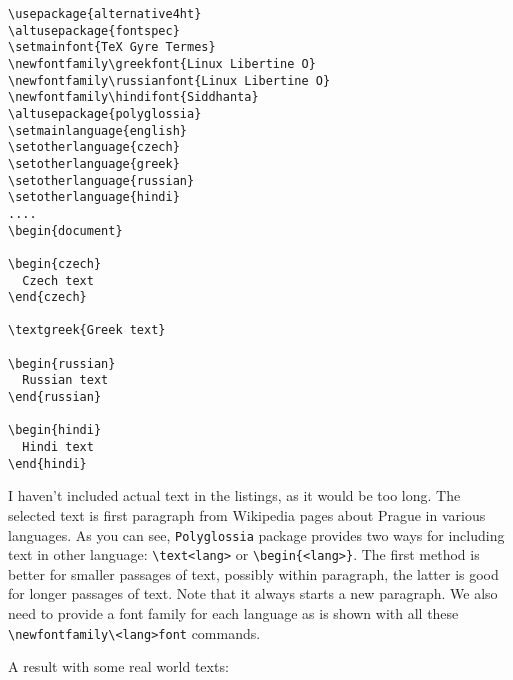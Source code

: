 \documentclass{article}
\begin{document}
\begin{verbatim}
\usepackage{alternative4ht}
\altusepackage{fontspec}
\setmainfont{TeX Gyre Termes}
\newfontfamily\greekfont{Linux Libertine O}
\newfontfamily\russianfont{Linux Libertine O}
\newfontfamily\hindifont{Siddhanta}
\altusepackage{polyglossia}
\setmainlanguage{english}
\setotherlanguage{czech}
\setotherlanguage{greek}
\setotherlanguage{russian}
\setotherlanguage{hindi}
....
\begin{document}

\begin{czech}
  Czech text
\end{czech}

\textgreek{Greek text}

\begin{russian}
  Russian text
\end{russian}

\begin{hindi}
  Hindi text
\end{hindi}
\end{verbatim}

I haven't included actual text in the listings, as it would be too long.
The selected text is first paragraph from Wikipedia pages about Prague in
various languages. As you can see, \texttt{Polyglossia} package provides two
ways for including text in other language: \verb|\text<lang>| or
\verb|\begin{<lang>}|.  The first method is better for smaller passages of
  text, possibly within paragraph, the latter is good for longer passages of
  text. Note that it always starts a new paragraph. We also need to provide a
  font family for each language as is shown with all these
  \verb|\newfontfamily\<lang>font| commands.

A result with some real world texts:
\end{document}
